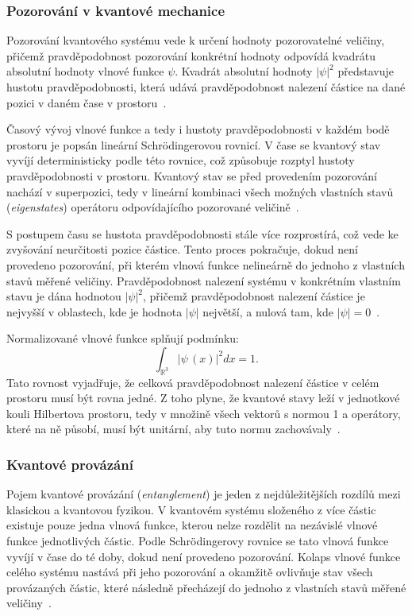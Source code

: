 \subsubsection*{Pozorování v kvantové mechanice}
Pozorování kvantového systému vede k určení hodnoty pozorovatelné veličiny, přičemž pravděpodobnost pozorování konkrétní hodnoty odpovídá kvadrátu absolutní hodnoty vlnové funkce $\psi$.
Kvadrát absolutní hodnoty $\left| \psi \right|^2$ představuje hustotu pravděpodobnosti, která udává pravděpodobnost nalezení částice na dané pozici v daném čase v prostoru~\cite{NaturalComputing}. 
    
Časový vývoj vlnové funkce a tedy i hustoty pravděpodobnosti v každém bodě prostoru je popsán lineární Schrödingerovou rovnicí. 
V čase se kvantový stav vyvíjí deterministicky podle této rovnice, což způsobuje rozptyl hustoty pravděpodobnosti v prostoru. 
Kvantový stav se před provedením pozorování nachází v superpozici, tedy v lineární kombinaci všech možných vlastních stavů (\emph{eigenstates}) operátoru odpovídajícího pozorované veličině~\cite{NaturalComputing}. 
    
S postupem času se hustota pravděpodobnosti stále více rozprostírá, což vede ke zvyšování neurčitosti pozice částice. 
Tento proces pokračuje, dokud není provedeno pozorování, při kterém vlnová funkce nelineárně  do jednoho z vlastních stavů měřené veličiny. 
Pravděpodobnost nalezení systému v konkrétním vlastním stavu je dána hodnotou $\left| \psi \right|^2$, přičemž pravděpodobnost nalezení částice je nejvyšší v oblastech, kde je hodnota $\left| \psi \right|$ největší, a nulová tam, kde $\left| \psi \right| = 0$~\cite{NaturalComputing}.
    
Normalizované vlnové funkce splňují podmínku:
\begin{equation*}
    \int_{\mathbb{R}^3} \left|\psi\,(x)\right|^2 dx = 1.    
\end{equation*}
Tato rovnost vyjadřuje, že celková pravděpodobnost nalezení částice v celém prostoru musí být rovna jedné.
Z toho plyne, že kvantové stavy leží v jednotkové kouli Hilbertova prostoru, tedy v množině všech vektorů s normou 1 a operátory, které na ně působí, musí být unitární, aby tuto normu zachovávaly~\cite{NaturalComputing}.

\subsubsection*{Kvantové provázání}
Pojem kvantové provázání (\emph{entanglement}) je jeden z nejdůležitějších rozdílů mezi klasickou a kvantovou fyzikou. 
V kvantovém systému složeného z více částic existuje pouze jedna vlnová funkce, kterou nelze rozdělit na nezávislé vlnové funkce jednotlivých částic. 
Podle Schrödingerovy rovnice se tato vlnová funkce vyvíjí v čase do té doby, dokud není provedeno pozorování.
Kolaps vlnové funkce celého systému nastává při jeho pozorování a okamžitě ovlivňuje stav všech provázaných částic, které následně přecházejí do jednoho z vlastních stavů měřené veličiny~\cite{NaturalComputing}.

